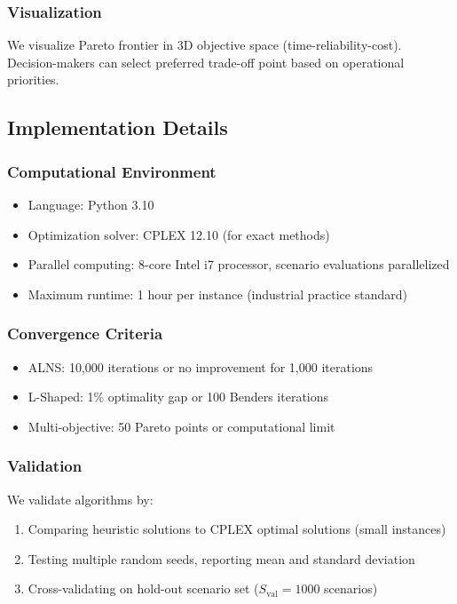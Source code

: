 \subsubsection{Visualization}

We visualize Pareto frontier in 3D objective space (time-reliability-cost). Decision-makers can select preferred trade-off point based on operational priorities.

\subsection{Implementation Details}

\subsubsection{Computational Environment}

\begin{itemize}
\item Language: Python 3.10
\item Optimization solver: CPLEX 12.10 (for exact methods)
\item Parallel computing: 8-core Intel i7 processor, scenario evaluations parallelized
\item Maximum runtime: 1 hour per instance (industrial practice standard)
\end{itemize}

\subsubsection{Convergence Criteria}

\begin{itemize}
\item ALNS: 10,000 iterations or no improvement for 1,000 iterations
\item L-Shaped: 1\% optimality gap or 100 Benders iterations
\item Multi-objective: 50 Pareto points or computational limit
\end{itemize}

\subsubsection{Validation}

We validate algorithms by:
\begin{enumerate}
\item Comparing heuristic solutions to CPLEX optimal solutions (small instances)
\item Testing multiple random seeds, reporting mean and standard deviation
\item Cross-validating on hold-out scenario set ($S_{\text{val}} = 1000$ scenarios)
\end{enumerate}

